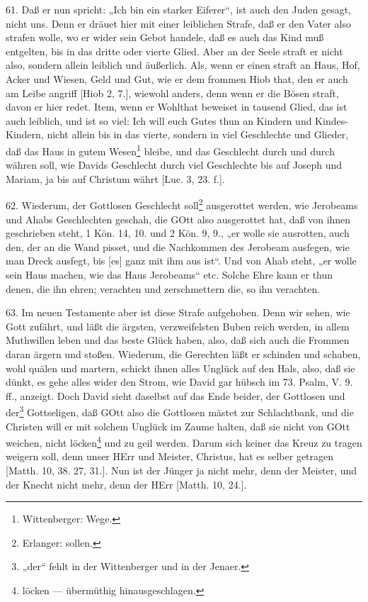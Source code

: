 61. Daß er nun spricht: „Ich bin ein starker Eiferer“, ist auch den Juden gesagt, nicht uns. Denn er dräuet hier mit einer leiblichen Strafe, daß er den Vater also strafen wolle, wo er wider sein Gebot handele, daß es auch das Kind muß entgelten, bis in das dritte oder vierte Glied. Aber an der Seele straft er nicht also, sondern allein leiblich und äußerlich. Als, wenn er einen straft an Haus, Hof, Acker und Wiesen, Geld und Gut, wie er dem frommen Hiob that, den er auch am Leibe angriff [Hiob 2, 7.], wiewohl anders, denn wenn er die Bösen straft, davon er hier redet. Item, wenn er Wohlthat beweiset in tausend Glied, das ist auch leiblich, und ist so viel: Ich will euch Gutes thun an Kindern und Kindes-Kindern, nicht allein bis in das vierte, sondern in viel Geschlechte und Glieder, daß das Haus in gutem Wesen\footnote{Wittenberger: Wege.} bleibe, und das Geschlecht durch und durch währen soll, wie Davids Geschlecht durch viel Geschlechte bis auf Joseph und Mariam, ja bis auf Christum währt [Luc. 3, 23. f.].

62. Wiederum, der Gottlosen Geschlecht soll\footnote{Erlanger: sollen.} ausgerottet werden, wie Jerobeams und Ahabs Geschlechten geschah, die GOtt also ausgerottet hat, daß von ihnen geschrieben steht, 1 Kön. 14, 10. und 2 Kön. 9, 9., „er wolle sie ausrotten, auch den, der an die Wand pisset, und die Nachkommen des Jerobeam ausfegen, wie man Dreck ausfegt, bis [es] ganz mit ihm aus ist“. Und von Ahab steht, „er wolle sein Haus machen, wie das Haus Jerobeams“ etc. Solche Ehre kann er thun denen, die ihn ehren; verachten und zerschmettern die, so ihn verachten.

63. Im neuen Testamente aber ist diese Strafe aufgehoben. Denn wir sehen, wie Gott zufährt, und läßt die ärgsten, verzweifelsten Buben reich werden, in allem Muthwillen leben und das beste Glück haben, also, daß sich auch die Frommen daran ärgern und stoßen. Wiederum, die Gerechten läßt er schinden und schaben, wohl quälen und martern, schickt ihnen alles Unglück auf den Hals, also, daß sie dünkt, es gehe alles wider den Strom, wie David gar hübsch im 73. Psalm, V. 9. ff., anzeigt. Doch David sieht daselbst auf das Ende beider, der Gottlosen und der\footnote{„der“ fehlt in der Wittenberger und in der Jenaer.} Gottseligen, daß GOtt also die Gottlosen mästet zur Schlachtbank, und die Christen will er mit solchem Unglück im Zaume halten, daß sie nicht von GOtt weichen, nicht löcken\footnote{löcken — übermüthig hinausgeschlagen.} und zu geil werden. Darum sich keiner das Kreuz zu tragen weigern soll, denn unser HErr und Meister, Christus, hat es selber getragen [Matth. 10, 38. 27, 31.]. Nun ist der Jünger ja nicht mehr, denn der Meister, und der Knecht nicht mehr, denn der HErr [Matth. 10, 24.].

